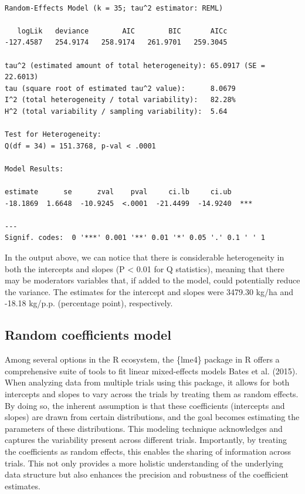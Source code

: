 \documentclass[
  letterpaper,
]{book}
\begin{document}
\begin{verbatim}

Random-Effects Model (k = 35; tau^2 estimator: REML)

   logLik   deviance        AIC        BIC       AICc   
-127.4587   254.9174   258.9174   261.9701   259.3045   

tau^2 (estimated amount of total heterogeneity): 65.0917 (SE = 22.6013)
tau (square root of estimated tau^2 value):      8.0679
I^2 (total heterogeneity / total variability):   82.28%
H^2 (total variability / sampling variability):  5.64

Test for Heterogeneity:
Q(df = 34) = 151.3768, p-val < .0001

Model Results:

estimate      se      zval    pval     ci.lb     ci.ub      
-18.1869  1.6648  -10.9245  <.0001  -21.4499  -14.9240  *** 

---
Signif. codes:  0 '***' 0.001 '**' 0.01 '*' 0.05 '.' 0.1 ' ' 1
\end{verbatim}

In the output above, we can notice that there is considerable
heterogeneity in both the intercepts and slopes (P \textless{} 0.01 for
Q statistics), meaning that there may be moderators variables that, if
added to the model, could potentially reduce the variance. The estimates
for the intercept and slopes were 3479.30 kg/ha and -18.18 kg/p.p.
(percentage point), respectively.

\hypertarget{random-coefficients-model}{%
\subsection{Random coefficients model}\label{random-coefficients-model}}

Among several options in the R ecosystem, the \{lme4\} package in R
offers a comprehensive suite of tools to fit linear mixed-effects models
Bates et al. (2015). When analyzing data from multiple trials using this
package, it allows for both intercepts and slopes to vary across the
trials by treating them as random effects. By doing so, the inherent
assumption is that these coefficients (intercepts and slopes) are drawn
from certain distributions, and the goal becomes estimating the
parameters of these distributions. This modeling technique acknowledges
and captures the variability present across different trials.
Importantly, by treating the coefficients as random effects, this
enables the sharing of information across trials. This not only provides
a more holistic understanding of the underlying data structure but also
enhances the precision and robustness of the coefficient estimates.
\end{document}
